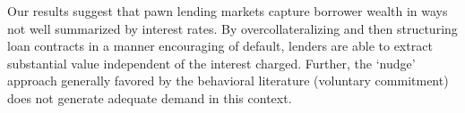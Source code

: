 \documentclass[oneside,11pt]{article}
\begin{document}
Our results suggest that pawn lending markets capture borrower wealth in ways not well summarized by interest rates. By overcollateralizing and then structuring loan contracts in a manner encouraging of default, lenders are able to extract substantial value independent of the interest charged.  Further, the `nudge’ approach generally favored by the behavioral literature (voluntary commitment) does not generate adequate demand in this context. 


\end{document}

